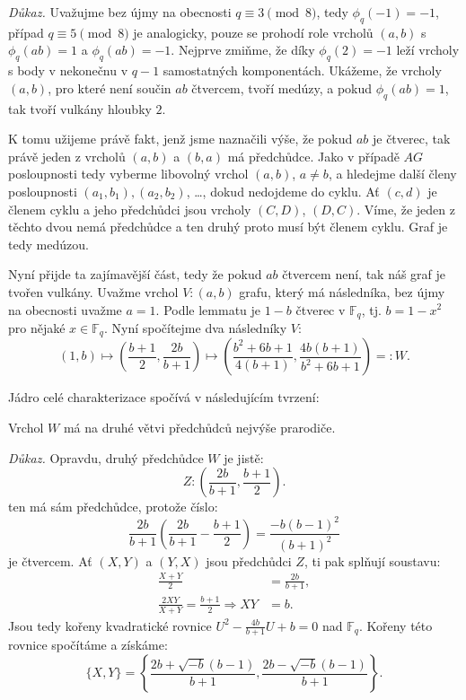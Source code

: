 \documentclass[12pt]{report}
\begin{document}
\noindent \textit{Důkaz.} Uvažujme bez újmy na obecnosti $q \equiv 3 \pmod{8}$, tedy $\phi_q(-1)= -1$, případ $q \equiv 5 \pmod{8}$ je analogicky, pouze se prohodí role vrcholů $(a,b)$ s $\phi_q(ab) =1$ a $\phi_q(ab) = -1$. Nejprve zmiňme, že díky $\phi_q(2) = -1$ leží vrcholy s body v nekonečnu v $q-1$ samostatných komponentách. Ukážeme, že vrcholy $(a,b)$, pro které není součin $ab$ čtvercem, tvoří medúzy, a pokud $\phi_q (ab) = 1$, tak tvoří vulkány hloubky $2$. 

K tomu užijeme právě fakt, jenž jsme naznačili výše, že pokud $ab$ je čtverec, tak právě jeden z vrcholů $(a,b)$ a $(b,a)$ má předchůdce. Jako v případě $AG$ posloupnosti tedy vyberme libovolný vrchol $(a,b)$, $a \neq b$, a hledejme další členy posloupnosti $(a_1,b_1), (a_2,b_2)$, \dots, dokud nedojdeme do cyklu. Ať $(c,d)$ je členem cyklu a jeho předchůdci jsou vrcholy $(C,D)$, $(D,C)$. Víme, že jeden z těchto dvou nemá předchůdce a ten druhý proto musí být členem cyklu. Graf je tedy medúzou.

Nyní přijde ta zajímavější část, tedy že pokud $ab$ čtvercem není, tak náš graf je tvořen vulkány. Uvažme vrchol $V : (a,b)$ grafu, který má následníka, bez újmy na obecnosti uvažme $a=1$. Podle lemmatu je $1-b$ čtverec v $\mathbb{F}_q$, tj. $b = 1-x^2$ pro nějaké $x \in \mathbb{F}_q$. Nyní spočítejme dva následníky $V$:
$$ (1,b) \longmapsto \left(\frac{b+1}{2}, \frac{2b}{b+1} \right) \longmapsto \left( \frac{b^2+6b+1}{4(b+1)}, \frac{4b(b+1)}{b^2+6b+1} \right) =: W. $$

Jádro celé charakterizace spočívá v následujícím tvrzení:

\begin{lemma*}
Vrchol $W$ má na druhé větvi předchůdců nejvýše prarodiče.
\end{lemma*}
\noindent \textit{Důkaz.}  Opravdu, druhý předchůdce $W$ je jistě:
$$Z : \left(\frac{2b}{b+1}, \frac{b+1}{2} \right).$$
ten má sám předchůdce, protože číslo:
$$\frac{2b}{b+1} \left( \frac{2b}{b+1} -  \frac{b+1}{2} \right) = \frac{-b (b-1)^2}{(b+1)^2}$$
je čtvercem. Ať $(X,Y)$ a $(Y,X)$ jsou předchůdci $Z$, ti pak splňují soustavu:
\begin{align*}
\frac{X+Y}{2} &= \frac{2b}{b+1},\\
\frac{2XY}{X+Y} =  \frac{b+1}{2} \Rightarrow XY &= b.
\end{align*}
Jsou tedy kořeny kvadratické rovnice $U^2 - \frac{4b}{b+1} U + b = 0$ nad $\mathbb{F}_q$.  Kořeny této rovnice spočítáme a získáme:
$$\lbrace X,Y \rbrace = \left\lbrace \frac{2b + \sqrt{-b}(b-1)}{b+1},\frac{2b - \sqrt{-b}(b-1)}{b+1} \right\rbrace.$$
\end{document}
